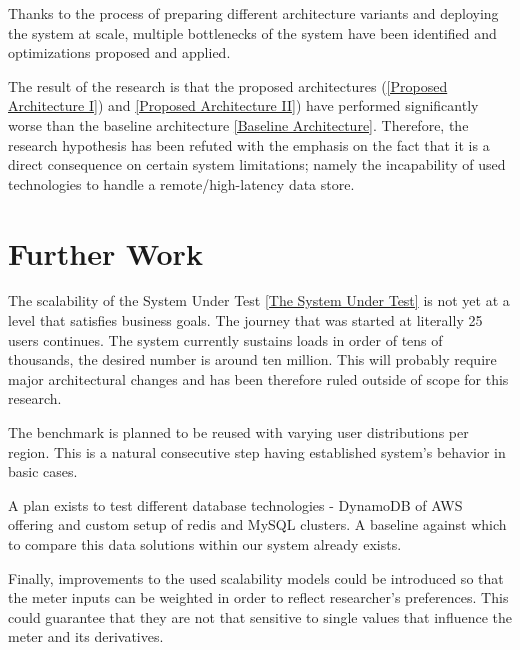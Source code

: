 \documentclass{uvamscse}
\begin{document}
Thanks to the process of preparing different architecture variants and deploying the system at scale, multiple bottlenecks of the system have been identified and optimizations proposed and applied.

The result of the research is that the proposed architectures (\ref{Proposed Architecture I}) and \ref{Proposed Architecture II}) have performed significantly worse than the baseline architecture \ref{Baseline Architecture}. Therefore, the research hypothesis has been refuted with the emphasis on the fact that it is a direct consequence on certain system limitations; namely the incapability of used technologies to handle a remote/high-latency data store.


\chapter{Further Work}\label{Further Work}

The scalability of the System Under Test \ref{The System Under Test} is not yet at a level that satisfies business goals. The journey that was started at literally 25 users continues. The system currently sustains loads in order of tens of thousands, the desired number is around ten million. This will probably require major architectural changes and has been therefore ruled outside of scope for this research.


The benchmark is planned to be reused with varying user distributions per region. This is a natural consecutive step having established system's behavior in basic cases.

A plan exists to test different database technologies - DynamoDB of AWS offering and custom setup of redis and MySQL clusters. A baseline against which to compare this data solutions within our system already exists.

Finally, improvements to the used scalability models could be introduced so that the meter inputs can be weighted in order to reflect researcher's preferences. This could guarantee that they are not that sensitive to single values that influence the meter and its derivatives.

{%


}
\end{document}
